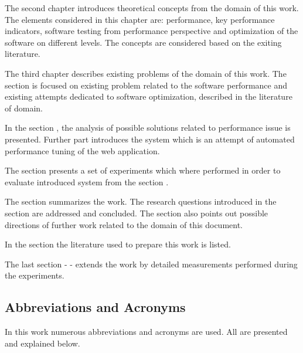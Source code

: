 \documentclass[12pt,a4paper]{article}
\begin{document}
The second chapter \textit{} introduces theoretical concepts from the domain of this work. The elements considered in this chapter are: performance, key performance indicators, software testing from performance perspective and optimization of the software on different levels. The concepts are considered based on the exiting literature. 
  
The third chapter \textit{} describes existing problems of the domain of this work. The section is focused on existing problem related to the software performance and existing attempts    dedicated to software optimization, described in the literature of domain.

In the section \textit{}, the  analysis of possible solutions related to performance issue is presented. Further part introduces the system which is an attempt of automated performance tuning of the web application.

The section \textit{} presents a set of experiments which where performed in order to evaluate introduced system from the section \textit{}. 

The \textit{} section summarizes the work. The research questions introduced in the section \textit{} are addressed and concluded. The section also points out possible directions of further work related to the domain of this document. 

In the section \textit{} the literature used to prepare this work is listed.

The last section - \textit{} - extends the work by detailed measurements performed during the experiments. 

\pagebreak
\subsection{Abbreviations and Acronyms}
In this work numerous abbreviations and acronyms are used. All are presented and explained below.

\vspace{0.3cm}
\end{document}
